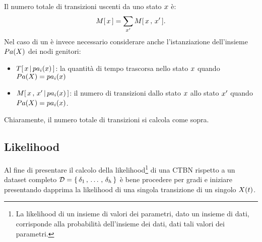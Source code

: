 Il numero totale di transizioni uscenti da uno stato $\mathnormal{x}$ è:
\[
\mstat{x}=\sum_{\setel{x}^\prime}\mstat[x]{\setel{x}^\prime}\text{.}
\]
Nel caso di un \mprocess*{} \cond*{} è invece necessario considerare anche l'istanziazione dell'insieme $Pa(\mathnormal{X})$ dei nodi genitori:
\begin{itemize}
    \item $T[\,\mathnormal{x\,\arrowvert\,pa_i(\mathnormal{x})}\,]$: la quantità di tempo trascorsa nello stato $\mathnormal{x}$ quando $Pa(\mathnormal{X})=pa_i(\mathnormal{x})$
    \item $\mstat[x]{\setel{x}^\prime\,\arrowvert\,pa_i(\setel{x})}$: il numero di transizioni dallo stato $\mathnormal{x}$ allo stato $\mathnormal{x}^\prime$ quando $Pa(\mathnormal{X})=pa_i(\mathnormal{x})$.
\end{itemize}
Chiaramente, il numero totale di transizioni si calcola come sopra.

\subsection{Likelihood}
\label{subsec:ctbn-likelihood}
Al fine di presentare il calcolo della likelihood\footnote{\label{note:likelihood}La likelihood di un insieme di valori dei parametri, dato un insieme di dati, corrisponde alla probabilità dell'insieme dei dati, dati tali valori dei parametri.} di una \acs{CTBN} rispetto a un dataset completo $\mathcal{D}=\{\,\delta_1\,,\,\dotsc\,,\,\delta_h\,\}$ è bene procedere per gradi e iniziare presentando dapprima la likelihood di una singola transizione di un singolo \mprocess*{} \omog*{} $\mathnormal{X}(t)$.

